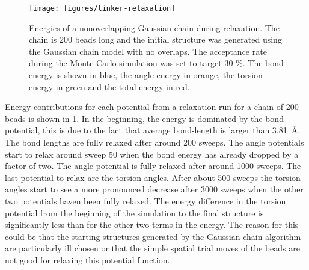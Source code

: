 \documentclass[12pt, twoside]{report}
\begin{document}
\begin{figure}[!ht] \centering
\texttt{[image: figures/linker-relaxation]}
\caption[Monte-Carlo relaxation simulation of a Gaussian polymer
chain.]{Energies of a nonoverlapping Gaussian chain during relaxation. The chain
is 200 beads long and the initial structure was generated using the Gaussian
chain model with no overlaps. The acceptance rate during the Monte Carlo
simulation was set to target 30 \%. The bond energy is shown in blue, the angle
energy in orange, the torsion energy in green and the total energy in red.}
\label{fig:linker-relaxation}
\end{figure} Energy contributions for each potential from a relaxation run for a
chain of 200 beads is shown in \cref{fig:linker-relaxation}. In the beginning,
the energy is dominated by the bond potential, this is due to the fact that
average bond-length is larger than \SI{3.81}{\AA}. The bond lengths are fully
relaxed after around 200 sweeps. The angle potentials start to relax around
sweep 50 when the bond energy has already dropped by a factor of two. The angle
potential is fully relaxed after around 1000 sweeps. The last potential to relax
are the torsion angles. After about 500 sweeps the torsion angles start to see a
more pronounced decrease after 3000 sweeps when the other two potentials haven
been fully relaxed. The energy difference in the torsion potential from the
beginning of the simulation to the final structure is significantly less than
for the other two terms in the energy. The reason for this could be that the
starting structures generated by the Gaussian chain algorithm are particularly
ill chosen or that the simple spatial trial moves of the beads are not good for
relaxing this potential function.
\end{document}
